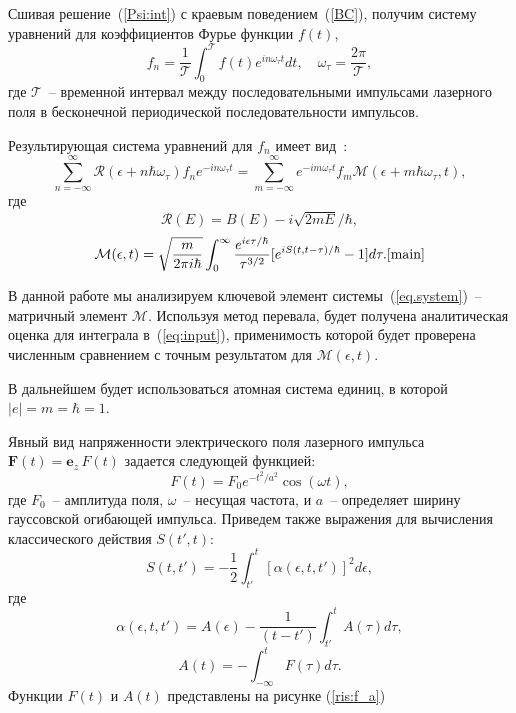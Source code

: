 \documentclass[14pt, a4paper]{article}
\numberwithin{figure}{section}
\numberwithin{equation}{section}
\newcommand{\vF}{\mathbf{F}}
\newcommand{\ve}{\mathbf{e}}
\newcommand{\cR}{\mathcal{R}}
\newcommand{\cM}{\mathcal{M}}
\newcommand{\cT}{\mathcal{T}}
\begin{document}
Сшивая решение~(\ref{Psi:int}) с краевым поведением~(\ref{BC}), получим систему уравнений для коэффициентов Фурье функции $f(t)$, 
\begin{equation}
\label{forier:f}
f_n=\frac{1}{\cT}\int_0^{\cT} f(t) e^{in\omega_\tau t}dt,\quad \omega_\tau = \frac{2\pi}{\cT}, 
\end{equation}
где $\cT$~-- временной интервал между последовательными импульсами лазерного поля в бесконечной периодической последовательности импульсов.

Результирующая система уравнений для $f_n$ имеет вид~\cite{main}:
\begin{equation}
\label{eq.system}
\sum_{n=-\infty}^\infty \cR(\epsilon+n\hbar\omega_\tau)f_ne^{-in\omega_\tau t} = \sum_{m=-\infty}^\infty e^{-im\omega_\tau t} f_m \cM(\epsilon+m\hbar\omega_\tau,t),
\end{equation}
где
\begin{equation}
\label{R}
\cR(E) = B(E) - i\sqrt{2mE}/\hbar,
\end{equation}
\begin{equation}
\label{eq:input}
\cM(\epsilon,t) = \sqrt{\frac{m}{2\pi i\hbar}}\int_0^{\infty}
\frac{e^{i\epsilon\tau/\hbar}}{\tau^{3/2}}[e^{iS(t,t-\tau)/\hbar}-1]d\tau. \cite{main}
\end{equation}

В данной работе мы анализируем ключевой элемент системы~(\ref{eq.system})~-- матричный элемент $\cM$. Используя метод перевала, будет получена аналитическая оценка для интеграла в~(\ref{eq:input}), применимость которой будет проверена численным сравнением с точным результатом для $\cM(\epsilon,t)$. 

В дальнейшем будет использоваться атомная система единиц, в которой $|e|=m=\hbar=1$.

Явный вид напряженности электрического поля лазерного импульса $\vF (t) = \ve_z\,F(t)$ задается следующей функцией:
\begin{equation}
\label{eq:f}
F(t) = F_0e^{-t^2/a^2}\cos(\omega t),
\end{equation}
где $F_0$~-- амплитуда поля, $\omega$~-- несущая частота, и $a$~-- определяет ширину гауссовской огибающей импульса.
Приведем также выражения для вычисления классического действия $S(t',t)$: 
\begin{equation}\label{eq:s}
S(t, t') = -\frac{1}{2}\int_{t'}^{t} [\alpha(\epsilon, t, t')]^2 d\epsilon,
\end{equation}
где
\begin{equation}\label{eq:alpha}
\alpha(\epsilon, t, t') = A(\epsilon) - \frac{1}{(t-t')}\int_{t'}^{t}A(\tau) d\tau,
\end{equation}
\begin{equation}\label{eq:a}
A(t) = -\int_{-\infty}^{t} F(\tau) d\tau.
\end{equation}
Функции $F(t)$ и $A(t)$ представлены на рисунке (\ref{ris:f_a})
\end{document}
